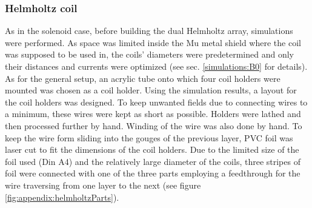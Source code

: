         \subsubsection{Helmholtz coil}
        \label{sec:matMeth:Helmholtz}
        As in the solenoid case, before building the dual Helmholtz array, simulations were performed.  As space was limited inside the Mu metal shield where the coil was supposed to be used in, the coils' diameters were predetermined and only their distances and currents were optimized (see sec. \ref{simulations:B0} for details). As for the general setup, an acrylic tube onto which four coil holders were mounted was chosen as a coil holder. Using the simulation results, a layout for the coil holders was designed. To keep unwanted fields due to connecting wires to a minimum, these wires were kept as short as possible. Holders were lathed and then processed further by hand. Winding of the wire was also done by hand. To keep the wire form sliding into the gouges of the previous layer, PVC foil was laser cut to fit the dimensions of the coil holders. Due to the limited size of the foil used (Din A4) and the relatively large diameter of the coils, three stripes of foil were connected with one of the three parts employing a feedthrough for the wire traversing from one layer to the next (see figure \ref{fig:appendix:helmholtzParts}).
